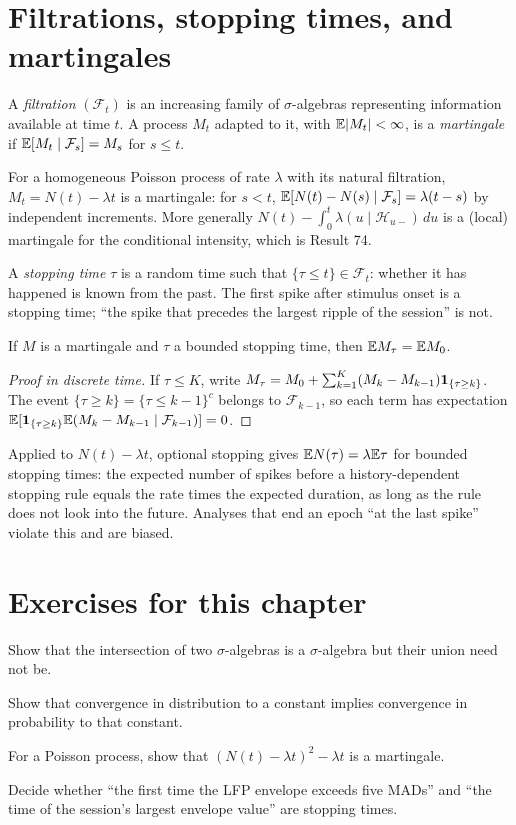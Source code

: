 \section{Filtrations, stopping times, and martingales}
A \emph{filtration} $(\mathcal F_t)$ is an increasing family of
$\sigma$-algebras representing information available at time $t$.
A process $M_t$ adapted to it, with $\mathbb{E}|M_t|<\infty$, is a
\emph{martingale} if $\mathbb{E}[M_t\mid\mathcal F_s]=M_s$ for $s\le t$.
\begin{example}
For a homogeneous Poisson process of rate $\lambda$ with its natural
filtration, $M_t=N(t)-\lambda t$ is a martingale: for $s<t$,
$\mathbb{E}[N(t)-N(s)\mid\mathcal F_s]=\lambda(t-s)$ by independent
increments. More generally $N(t)-\int_0^t\lambda(u\mid\mathcal H_{u-})\,du$
is a (local) martingale for the conditional intensity, which is
Result 74.
\end{example}
A \emph{stopping time} $\tau$ is a random time such that
$\{\tau\le t\}\in\mathcal F_t$: whether it has happened is known from
the past. The first spike after stimulus onset is a stopping time;
``the spike that precedes the largest ripple of the session'' is not.
\begin{theorem}
If $M$ is a martingale and $\tau$ a bounded stopping time, then
$\mathbb{E} M_\tau=\mathbb{E} M_0$.
\end{theorem}
\begin{proof}[Proof in discrete time]
If $\tau\le K$, write $M_\tau=M_0+\sum_{k=1}^K(M_k-M_{k-1})\mathbf{1}_{\{\tau\ge k\}}$.
The event $\{\tau\ge k\}=\{\tau\le k-1\}^c$ belongs to $\mathcal F_{k-1}$,
so each term has expectation
$\mathbb{E}[\mathbf{1}_{\{\tau\ge k\}}\mathbb{E}(M_k-M_{k-1}\mid\mathcal F_{k-1})]=0$.
\end{proof}
Applied to $N(t)-\lambda t$, optional stopping gives
$\mathbb{E} N(\tau)=\lambda\mathbb{E}\tau$ for bounded stopping times: the expected
number of spikes before a history-dependent stopping rule equals the
rate times the expected duration, as long as the rule does not look
into the future. Analyses that end an epoch ``at the last spike'' violate
this and are biased.

\section*{Exercises for this chapter}
\begin{exercise}
Show that the intersection of two $\sigma$-algebras is a $\sigma$-algebra
but their union need not be.
\end{exercise}
\begin{exercise}
Show that convergence in distribution to a constant implies convergence
in probability to that constant.
\end{exercise}
\begin{exercise}
For a Poisson process, show that $(N(t)-\lambda t)^2-\lambda t$ is a
martingale.
\end{exercise}
\begin{exercise}
Decide whether ``the first time the LFP envelope exceeds five MADs'' and
``the time of the session's largest envelope value'' are stopping times.
\end{exercise}
